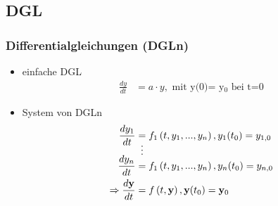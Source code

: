   \subsection{DGL}
  \begin{frame}
      \frametitle{Differentialgleichungen (DGLn)}
      \begin{itemize}
        \item einfache DGL
           \begin{align*}
             \frac{dy}{dt} &= a \cdot y,\text{ mit y(0)= y$_{0}$ bei t=0}
           \end{align*}
        \item System von DGLn
            \begin{align*}
               \frac{dy_{1}}{dt} &= f_{1}\left( t,y_{1},...,y_{n} \right), y_{1}(t_{0})=y_{1,0} \\
               & \shortvdotswithin{=}
               \frac{dy_{n}}{dt} &= f_{1}\left( t,y_{1},...,y_{n} \right), y_{n}(t_{0})=y_{n,0} \\
               \Rightarrow \frac{d\textbf{y}}{dt} &= f\left( t,\textbf{y} \right), \textbf{y}(t_{0})=\textbf{y$_{0}$} \\
             \end{align*}

      \end{itemize}
  \end{frame}

